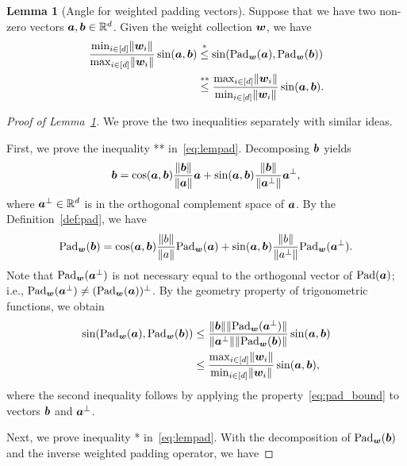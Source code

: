 \documentclass[journal]{IEEEtran}
\theoremstyle{definition}
\newtheorem{lem}{Lemma}
\theoremstyle{definition}
\begin{document}
\begin{lem}[Angle for weighted padding vectors]\label{lem:pad} Suppose that we have two non-zero vectors $\bm{a}, \bm{b} \in \mathbb{R}^d$. Given the weight collection $\bm{w}$, we have 
\begin{align}
    \frac{\min_{i \in [d]} \onormSize{}{\mw_i}}{\max_{i \in [d]} \onormSize{}{\mw_i} } \sin (\ma, \mb) & \stackrel{*}{\leq} \sin(\pad_{\mw}(\ma),  \pad_{\mw}(\mb)) \\
    & \stackrel{**}{\leq} \frac{ \max_{i \in [d]} \onormSize{}{\mw_i} }{\min_{i \in [d]} \onormSize{}{\mw_i}} \sin (\ma, \mb). \label{eq:lempad}
\end{align}
\end{lem}

\begin{proof}[Proof of Lemma~\ref{lem:pad}] We prove the two inequalities separately with similar ideas.

First, we prove the inequality ** in~\eqref{eq:lempad}. Decomposing $\bm{b}$ yields
\begin{equation}
    \bm{b} = \cos (\bm{a}, \bm{b}) \frac{\lVert\bm{b}\rVert}{\lVert\bm{a}\rVert} \bm{a} + \sin (\bm{a}, \bm{b}) \frac{\lVert\bm{b}\rVert}{\lVert\bm{a}^{\perp}\rVert}\bm{a}^{\perp},
\end{equation}
where $\bm{a}^{\perp} \in \mathbb{R}^d$ is in the orthogonal complement space of $\bm{a}$. By the Definition~\ref{def:pad}, we have 
\begin{equation}\label{eq:pad_second_ineq}
    \pad_{\mw}(\mb) = \cos (\ma, \mb) \frac{\onormSize{}{b}}{\onormSize{}{a}} \pad_{\mw}(\ma) + \sin (\ma, \mb) \frac{\onormSize{}{b}}{\onormSize{}{a^{\perp}}} \pad_{\mw}(\ma^{\perp}).
\end{equation}
Note that $\text{Pad}_{\bm{w}}(\bm{a}^{\perp})$ is not necessary equal to the orthogonal vector of $\text{Pad}(\bm{a})$; i.e., $\text{Pad}_{\bm{w}}(\bm{a}^{\perp}) \neq (\text{Pad}_{\bm{w}}(\bm{a}))^{\perp}$. By the geometry property of trigonometric functions, we obtain
\begin{align}
    \sin(\text{Pad}_{\bm{w}}(\bm{a}),  \text{Pad}_{\bm{w}}(\bm{b}))  &\leq \frac{  \lVert\bm{b}\rVert \lVert\text{Pad}_{\bm{w}}(\bm{a}^{\perp})\rVert }{ \lVert\bm{a}^{\perp}\rVert \lVert \text{Pad}_{\bm{w}}(\bm{b})\rVert} \sin (\bm{a}, \bm{b})  \\
    & \leq  \frac{ \max_{i \in [d]} \lVert\bm{w}_i\rVert }{\min_{i \in [d]} \lVert\bm{w}_i\rVert} \sin (\bm{a}, \bm{b}),
\end{align}
where the second inequality follows by applying the property~\eqref{eq:pad_bound} to vectors $\bm{b}$ and $\bm{a}^{\perp}$. 

Next, we prove inequality * in~\eqref{eq:lempad}. With the decomposition of $\text{Pad}_{\bm{w}}(\bm{b})$ and the inverse weighted padding operator, we have 


\end{proof}
\end{document}
